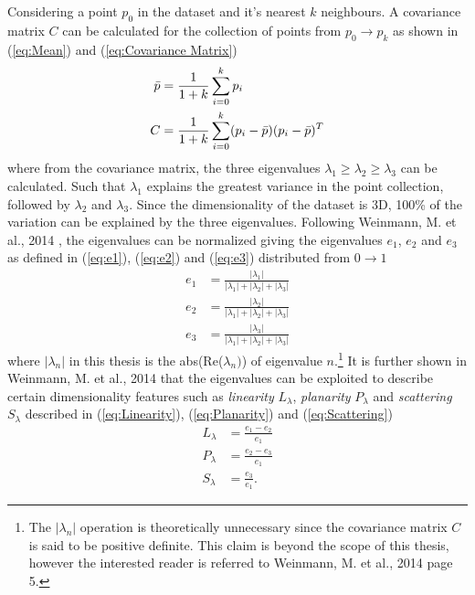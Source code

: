 \documentclass[%
]{USN-MSc}
\begin{document}
Considering a point \(p_0\) in the dataset and it's nearest \(k\) neighbours. A covariance matrix \(C\) can be calculated for the collection of points from \(p_0 \to p_k\) as shown in (\ref{eq:Mean}) and (\ref{eq:Covariance Matrix})
\begin{align}
\label{eq:Mean}
    \Bar{p} &= \frac{1}{1+k}\sum_{i=0}^k p_i \\
\label{eq:Covariance Matrix}
    C  &= \frac{1}{1+k}\sum_{i=0}^k (p_i-\Bar{p})(p_i-\Bar{p})^T
\end{align}
where from the covariance matrix, the three eigenvalues \(\lambda_1 \geq \lambda_2 \geq \lambda_3\) can be calculated. Such that \(\lambda_1\) explains the greatest variance in the point collection, followed by \(\lambda_2\) and \(\lambda_3\). Since the dimensionality of the dataset is 3D, 100\% of the variation can be explained by the three eigenvalues. Following  Weinmann, M. et al., 2014 \cite{optimal-K-Nearest-Neighborhood}, the eigenvalues can be normalized giving the eigenvalues \(e_1\), \(e_2\) and \(e_3\) as defined in (\ref{eq:e1}), (\ref{eq:e2}) and (\ref{eq:e3}) distributed from \(0 \to 1\) 
\begin{align}
\label{eq:e1}
e_1 &= \frac{|\lambda_1|}{|\lambda_1|+|\lambda_2|+|\lambda_3|}   \\
\label{eq:e2}
e_2 &= \frac{|\lambda_2|}{|\lambda_1|+|\lambda_2|+|\lambda_3|}    \\
\label{eq:e3}
e_3 &= \frac{|\lambda_3|}{|\lambda_1|+|\lambda_2|+|\lambda_3|}
\end{align}
where \(|\lambda_n|\) in this thesis is the abs(Re(\(\lambda_n)\)) of eigenvalue \(n\).\footnote{The \(|\lambda_n|\) operation is theoretically unnecessary since the covariance matrix \(C\) is said to be positive definite. This claim is beyond the scope of this thesis, however the interested reader is referred to Weinmann, M. et al., 2014 \cite{optimal-K-Nearest-Neighborhood} page 5.}
It is further shown in  Weinmann, M. et al., 2014 \cite{optimal-K-Nearest-Neighborhood} that the eigenvalues can be exploited to describe certain dimensionality features such as \textit{linearity} \(L_\lambda\), \textit{planarity} \(P_\lambda\)  and \textit{scattering} \(S_\lambda\) described in (\ref{eq:Linearity}), (\ref{eq:Planarity}) and (\ref{eq:Scattering})
\begin{align}
\label{eq:Linearity}
L_\lambda &=\frac{e_1-e_2}{e_1}  \\
\label{eq:Planarity}
P_\lambda &=\frac{e_2-e_3}{e_1}  \\
\label{eq:Scattering}
S_\lambda &=\frac{e_3}{e_1}    .
\end{align}
\end{document}
